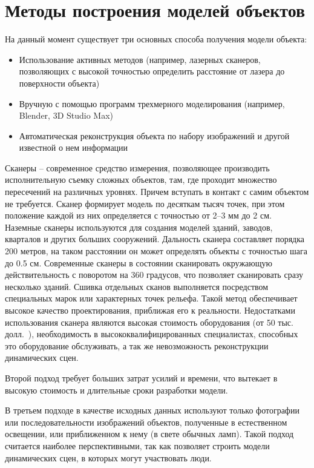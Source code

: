 \section{Методы построения моделей объектов}
На данный момент существует три основных способа получения модели объекта:
\begin{itemize}
\item Использование активных методов (например, лазерных сканеров, позволяющих с высокой точностью определить расстояние от лазера до поверхности объекта)
\item Вручную с помощью программ трехмерного моделирования (например, Blender, 3D Studio Max)
\item Автоматическая реконструкция объекта по набору изображений и другой известной о нем информации
\end{itemize}

Сканеры -- современное средство измерения, позволяющее производить исполнительную съемку сложных объектов, там, где проходит множество пересечений на различных уровнях. Причем вступать в контакт с самим объектом не требуется. Сканер формирует модель по десяткам тысяч точек, при этом положение каждой из них определяется с точностью от 2--3 мм до 2 см. Наземные сканеры используются для создания моделей зданий, заводов, кварталов и других больших сооружений. Дальность сканера составляет порядка 200 метров, на таком расстоянии он может определять объекты с точностью шага до 0.5 см. Современные сканеры в состоянии сканировать окружающую действительность с поворотом на 360 градусов, что позволяет сканировать сразу несколько зданий. Сшивка отдельных сканов выполняется посредством специальных марок или характерных точек рельефа. Такой метод обеспечивает высокое качество проектирования, приближая его к реальности. Недостатками использования сканера являются высокая стоимость оборудования (от 50 тыс. долл.~\cite{laser_scanner}), необходимость в высококвалифицированных специалистах, способных это оборудование обслуживать, а так же невозможность реконструкции динамических сцен.~\cite{komarova_voxel_coloring}

Второй подход требует больших затрат усилий и времени, что вытекает в высокую стоимость и длительные сроки разработки модели.

В третьем подходе в качестве исходных данных используют только фотографии или последовательности изображений объектов, полученные в естественном освещении, или приближенном к нему (в свете обычных ламп). Такой подход считается наиболее перспективными, так как позволяет строить модели динамических сцен, в которых могут участвовать люди.

